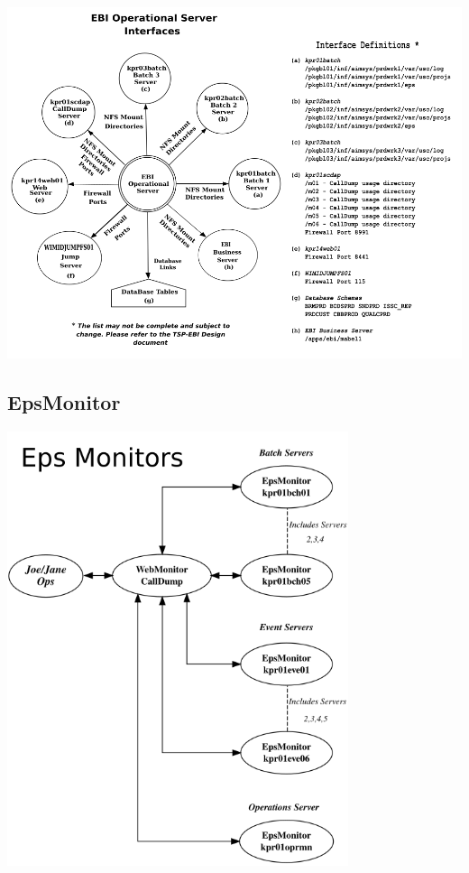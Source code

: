 \documentclass[12pt,twoside]{article}
\begin{document}
\begin{landscape}  
\includegraphics[width=22cm]{Pictures/EBI_Operational_Server.png}


\end{landscape} 
\newpage
\subsection{EpsMonitor}
\label{sec:orgheadline13}
\includegraphics[width=10cm]{Pictures/EpsMonitors.png}
\end{document}
